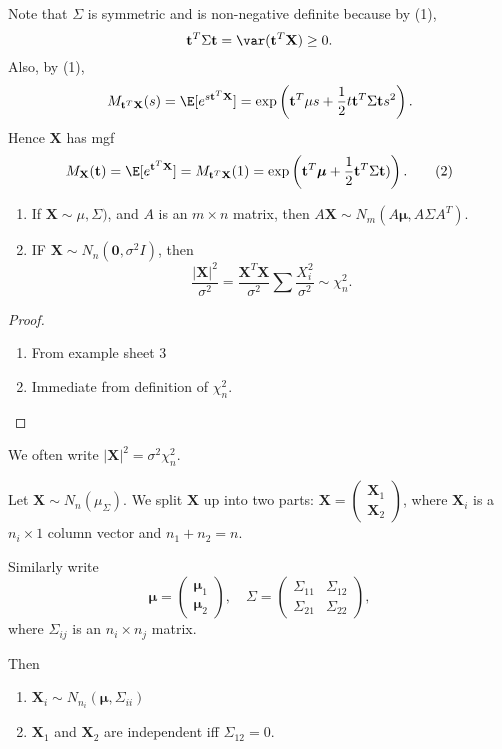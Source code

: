 \documentclass[a4paper]{article}
\begin{document}
Note that $\Sigma$ is symmetric and is non-negative definite because by (1),
\[
  \mathbf{t}^T\Sigma \mathbf{t} = \var(\mathbf{t}^T\mathbf{X}) \geq 0.
\]
Also, by (1),
\[
  M_{\mathbf{t}^T \mathbf{X}}(s) = \E[e^{s\mathbf{t}^T\mathbf{X}}] = \exp\left(\mathbf{t}^T\mu s + \frac{1}{2}t\mathbf{t}^T\Sigma \mathbf{t}s^2\right).
\]
Hence $\mathbf{X}$ has mgf
\[
  M_\mathbf{X}(\mathbf{t}) = \E[e^{\mathbf{t}^T \mathbf{X}}]= M_{\mathbf{t}^T\mathbf{X}}(1) = \exp\left(\mathbf{t}^T\boldsymbol\mu + \frac{1}{2}\mathbf{t}^T \Sigma \mathbf{t})\right).\tag{2}
\]

\begin{prop}\leavevmode
  \begin{enumerate}
    \item If $\mathbf{X} \sim \mu, \Sigma)$, and $A$ is an $m\times n$ matrix, then $A\mathbf{X} \sim N_m (A\boldsymbol\mu, A\Sigma A^T)$.
    \item IF $\mathbf{X}\sim N_n(\mathbf{0}, \sigma^2 I)$, then
      \[
        \frac{|\mathbf{X}|^2}{\sigma^2} = \frac{\mathbf{X}^T\mathbf{X}}{\sigma^2}\sum \frac{X_i^2}{\sigma ^2}\sim \chi_n^2.
      \]
  \end{enumerate}
\end{prop}
\begin{proof}\leavevmode
  \begin{enumerate}
    \item From example sheet 3
    \item Immediate from definition of $\chi_n^2$.
  \end{enumerate}
\end{proof}

\begin{notation}
  We often write $|\mathbf{X}|^2 = \sigma^2 \chi_n^2$.
\end{notation}

\begin{prop}
  Let $\mathbf{X}\sim N_n(\mu_\Sigma)$. We split $\mathbf{X}$ up into two parts: $\mathbf{X} =
  \begin{pmatrix}
    \mathbf{X}_1\\
    \mathbf{X}_2
  \end{pmatrix}$, where $\mathbf{X}_i$ is a $n_i \times 1$ column vector and $n_1 + n_2 = n$.

  Similarly write
  \[
    \boldsymbol\mu =
    \begin{pmatrix}
      \boldsymbol\mu_1\\
      \boldsymbol\mu_2
    \end{pmatrix}
    ,\quad
    \Sigma =
    \begin{pmatrix}
      \Sigma_{11} & \Sigma_{12}\\
      \Sigma_{21} & \Sigma_{22}
    \end{pmatrix},
  \]
  where $\Sigma_{ij}$ is an $n_i\times n_j$ matrix.

  Then
  \begin{enumerate}
    \item $\mathbf{X}_i \sim N_{n_i}(\boldsymbol\mu, \Sigma_{ii})$
    \item $\mathbf{X}_1$ and $\mathbf{X}_2$ are independent iff $\Sigma_{12} = 0$.
  \end{enumerate}
\end{prop}
\end{document}

